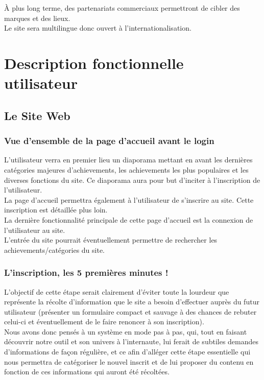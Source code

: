\documentclass{life-fr}
\begin{document}
À plus long terme, des partenariats commerciaux permettront de cibler des marques et des lieux.\\

Le site sera multilingue donc ouvert à l'internationalisation.

\chapter{Description fonctionnelle utilisateur}

\section{Le Site Web}

\subsection{Vue d'ensemble de la page d'accueil avant le login}

L'utilisateur verra en premier lieu un diaporama mettant en avant les dernières catégories majeures d'achievements, les achievements les plus populaires et les diverses fonctions du site. Ce diaporama aura pour but d'inciter à l'inscription de l'utilisateur.\\

La page d'accueil permettra également à l'utilisateur de s'inscrire au site. Cette inscription est détaillée plus loin.\\

La dernière fonctionnalité principale de cette page d'accueil est la connexion de l'utilisateur au site.\\

L'entrée du site pourrait éventuellement permettre de rechercher les achievements/catégories du site.

\subsection{L'inscription, les 5 premières minutes !}

L'objectif de cette étape serait clairement d'éviter toute la lourdeur que représente la récolte d'information que le site a besoin d'effectuer auprès du futur utilisateur (présenter un formulaire compact et sauvage à des chances de rebuter celui-ci et éventuellement de le faire renoncer à son inscription).\\

Nous avons donc pensés à un système en mode pas à pas, qui, tout en faisant découvrir notre outil et son univers à l'internaute, lui ferait de subtiles demandes d'informations de façon régulière, et ce afin d'alléger cette étape essentielle qui nous permettra de catégoriser le nouvel inscrit et de lui proposer du contenu en fonction de ces informations qui auront été récoltées.\\
\end{document}
